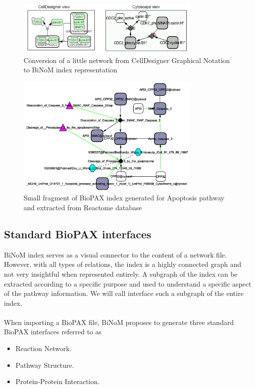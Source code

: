 \begin{figure}
\centering
\includegraphics[width=0.8\textwidth]{graphics/From_CellDesigner_to_Cytoscape}
\caption{Conversion of a little network from CellDesigner Graphical Notation to BiNoM index representation}
\label{From_CellDesigner_to_Cytoscape}
\end{figure}
\begin{figure}
\centering
\includegraphics[width=0.8\textwidth]{graphics/Fragment_of_Apoptosis_from_Reactome}
\caption{Small fragment of BioPAX index generated for Apoptosis pathway and extracted from Reactome database}
\label{Fragment_of_Apoptosis_from_Reactome}
\end{figure}

\subsection{Standard BioPAX interfaces}\label{Standard_BioPAX_Interfaces}
BiNoM index serves as a visual connector to the content of a network file. However, with all types of relations, the index is a highly connected graph and not very insightful when represented entirely. A subgraph of the index can be extracted according to a specific purpose and used to understand a specific aspect of the pathway information. We will call interface such a subgraph of the entire index.\\\\
When importing a BioPAX file, BiNoM proposes to generate three standard BioPAX interfaces referred to as
\nopagebreak
\begin{itemize}
\item Reaction Network.
\item Pathway Structure.
\item Protein-Protein Interaction.
\end{itemize}
